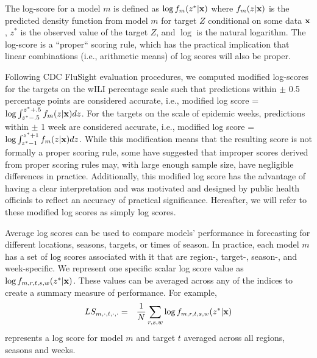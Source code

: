\documentclass[9pt,twocolumn,twoside]{pnas-new}\usepackage[]{graphicx}\usepackage[]{color}
\begin{document}
{%
The log-score for a model $m$ is defined as $\log f_m(z^*|\bf{x})$ where $f_m(z|\bf{x})$ is the predicted density function from model $m$ for target $Z$ conditional on some data $\bf{x}$, $z^*$ is the observed value of the target $Z$, and $\log$ is the natural logarithm. 
The log-score is a ``proper`` scoring rule, which has the practical implication that linear combinations (i.e., arithmetic means) of log scores will also be proper.\cite{Gneiting2007}

Following CDC FluSight evaluation procedures, we computed modified log-scores for the targets on the wILI percentage scale such that predictions within $\pm$ 0.5 percentage points are considered accurate, i.e., modified log score = $\log \int_{z^* -.5}^{z^* + .5} f_m(z|{\bf{x}})dz$. 
For the targets on the scale of epidemic weeks, predictions within $\pm$ 1 week are considered accurate, i.e., modified log score = $\log \int_{z^* -1}^{z^* + 1} f_m(z|{\bf{x}})dz$. 
While this modification means that the resulting score is not formally a proper scoring rule, some have suggested that improper scores derived from proper scoring rules may, with large enough sample size, have negligible differences in practice.\cite{Gneiting2007} %
Additionally, this modified log score has the advantage of having a clear interpretation and was  motivated and designed by public health officials to reflect an accuracy of practical significance.
Hereafter, we will refer to these modified log scores as simply log scores.

Average log scores can be used to compare models' performance in forecasting for different locations, seasons, targets, or times of season.
In practice, each model $m$ has a set of log scores associated with it that are region-, target-, season-, and week-specific.
We represent one specific scalar log score value as $\log f_{m,r,t,s,w}(z^*|\bf{x})$. 
These values can be averaged across any of the indices to create a summary measure of performance.
For example,
\begin{eqnarray}
LS_{m,\cdot,t,\cdot,\cdot} & = & \frac{1}{N} \sum_{r,s,w} \log f_{m,r,t,s,w}(z^*|{\bf x}) \label{eqn:logscore}
\end{eqnarray}
represents a log score for model $m$ and target $t$ averaged across all regions, seasons and weeks.

}
\end{document}
